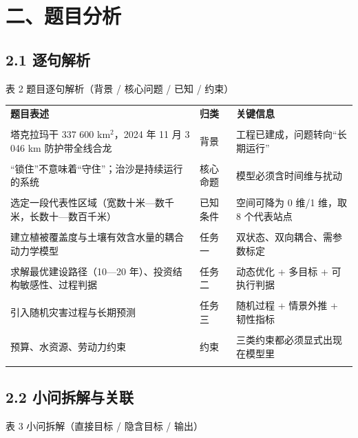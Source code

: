 \documentclass[11pt,a4paper]{ctexart}
\begin{document}
\section*{二、题目分析}

\subsection*{2.1 逐句解析}
表 2  题目逐句解析（背景 / 核心问题 / 已知 / 约束）


\begin{table}[H]\centering\small\setlength{\parskip}{2pt}
\begin{tabularx}{\textwidth}{|X|X|X|}
\toprule
\textbf{题目表述} & \textbf{归类} & \textbf{关键信息} \\\\
\midrule
塔克拉玛干 337 600 km$^{2}$，2024 年 11 月 3 046 km 防护带全线合龙 & 背景 & 工程已建成，问题转向“长期运行” \\\\
“锁住”不意味着“守住”；治沙是持续运行的系统 & 核心命题 & 模型必须含时间维与扰动 \\\\
选定一段代表性区域（宽数十米—数千米，长数十—数百千米） & 已知条件 & 空间可降为 0 维/1 维，取 8 个代表站点 \\\\
建立植被覆盖度与土壤有效含水量的耦合动力学模型 & 任务一 & 双状态、双向耦合、需参数标定 \\\\
求解最优建设路径（10—20 年）、投资结构敏感性、过程判据 & 任务二 & 动态优化 + 多目标 + 可执行判据 \\\\
引入随机灾害过程与长期预测 & 任务三 & 随机过程 + 情景外推 + 韧性指标 \\\\
预算、水资源、劳动力约束 & 约束 & 三类约束都必须显式出现在模型里 \\\\
\bottomrule
\end{tabularx}
\end{table}

\subsection*{2.2 小问拆解与关联}
表 3  小问拆解（直接目标 / 隐含目标 / 输出）
\end{document}
